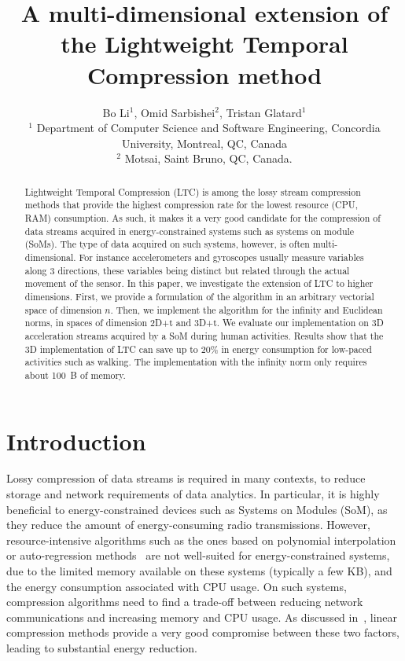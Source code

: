 \documentclass[10pt, conference, compsocconf]{IEEEtran}
\begin{document}
\title{A multi-dimensional extension of the Lightweight Temporal Compression method}

\author{Bo Li$^1$, Omid Sarbishei$^2$, Tristan Glatard$^1$\\
  $^1$ Department of Computer Science and Software Engineering, Concordia University, Montreal, QC, Canada \\
  $^2$ Motsai, Saint Bruno, QC, Canada.}
\maketitle

\begin{abstract}
Lightweight Temporal Compression
(LTC) is among the lossy stream
compression methods that provide the highest compression rate for the
lowest resource (CPU, RAM) consumption. As such, it makes it a very
good candidate for the compression of data streams acquired in
energy-constrained systems such as systems on module (SoMs). The type of data acquired on
such systems, however, is often multi-dimensional. For instance 
accelerometers and gyroscopes usually measure variables along 3 
directions, these variables being distinct but related through the 
actual movement of the sensor. In this paper, we investigate the 
extension of LTC to higher dimensions. First, we provide a formulation 
of the algorithm in an arbitrary vectorial space of dimension $n$. 
Then, we implement the algorithm for the infinity and Euclidean norms, 
in spaces of dimension 2D+t and 3D+t. We evaluate our implementation on 
3D acceleration streams acquired by a SoM during human activities. 
Results show that the 3D implementation of LTC can save up to 20\% in 
energy consumption for low-paced activities such as walking. The 
implementation with the infinity norm only requires about 100~B of 
memory.
\end{abstract}

\section{Introduction}

Lossy compression of data streams is required in many contexts, to reduce 
storage and network requirements of data analytics. In particular, it 
is highly beneficial to energy-constrained devices such as Systems on 
Modules (SoM), as they reduce the amount of energy-consuming radio 
transmissions. However, resource-intensive algorithms such as the ones 
based on polynomial interpolation or auto-regression 
methods~\cite{lu2010optimized} are not well-suited for 
energy-constrained systems, due to the limited memory available on 
these systems (typically a few KB), and the energy consumption 
associated with CPU usage. On such systems, compression algorithms need 
to find a trade-off between reducing network communications and 
increasing memory and CPU usage. As 
discussed in~\cite{zordan2014performance}, linear compression methods 
provide a very good compromise between these two factors, leading to 
substantial energy reduction.
\end{document}

